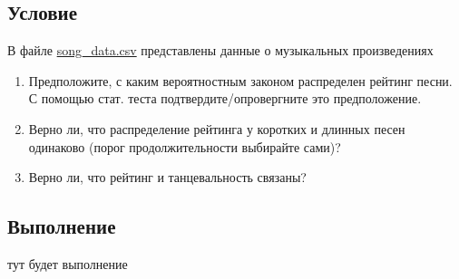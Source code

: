 \documentclass[a4paper, 12pt]{article}
\begin{document}
    \subsection{Условие}
    В файле \href{https://drive.google.com/file/d/1KRbKtVb6Xkyc8_2gKT9G6N5N_yD7FQXC/view}{song\_data.csv} представлены данные
    о музыкальных произведениях
    \begin{enumerate}
        \item Предположите, с каким вероятностным законом распределен рейтинг песни. С помощью стат.
        теста подтвердите/опровергните это предположение.
        \item Верно ли, что распределение рейтинга у коротких и длинных песен одинаково (порог
        продолжительности выбирайте сами)?
        \item Верно ли, что рейтинг и танцевальность связаны?
    \end{enumerate}


    \subsection{Выполнение}
    тут будет выполнение
\end{document}
